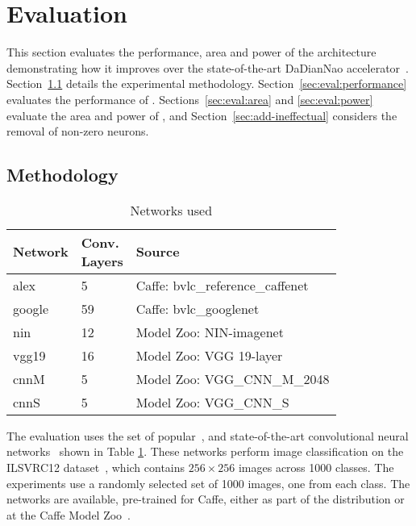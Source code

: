 \section{Evaluation}
\label{sec:eval}

This section evaluates the performance, area and power of the \ZF architecture demonstrating how it improves over the state-of-the-art  DaDianNao accelerator~\cite{DaDiannao}. 
Section~\ref{sec:eval:method} details the experimental methodology. 
Section~\ref{sec:eval:performance} evaluates the performance of \ZF. 
Sections~\ref{sec:eval:area} and \ref{sec:eval:power} evaluate the area and power of \ZF, and Section~\ref{sec:add-ineffectual} considers the removal of non-zero neurons.

%
%

%

\subsection{Methodology}
\label{sec:eval:method}


%
%
\begin{table}[t!]
\centering
\begin{tabular}{|l|l|l|}
\hline
\textbf{Network} & \pbox{5cm}{\textbf{Conv.} \\ \textbf{Layers}} & \textbf{Source} \\ \hline \hline
alex     	 & 5 & Caffe: bvlc\_reference\_caffenet \\ \hline
google 	 & 59 & Caffe: bvlc\_googlenet \\ \hline
nin 		 & 12 & Model Zoo: NIN-imagenet \\ \hline
vgg19  	 & 16 & Model Zoo: VGG 19-layer \\ \hline
cnnM  & 5 & Model Zoo: VGG\_CNN\_M\_2048 \\ \hline
cnnS  & 5 & Model Zoo: VGG\_CNN\_S \\ \hline
\end{tabular}
\caption{Networks used}
\label{table:networks}
\end{table}

The evaluation uses the set of popular~\cite{AlexNIPS2012}, and state-of-the-art convolutional neural networks~\cite{ILSVRC15}\cite{nin}\cite{vgg}\cite{vgg19} shown in Table \ref{table:networks}. 
These networks perform image classification on the ILSVRC12 dataset~\cite{ILSVRC15}, which contains $256\times256$ images across 1000 classes. 
The experiments use a randomly selected set of 1000 images, one from each class. The networks are available, pre-trained for Caffe, either as part of the distribution or at the Caffe Model Zoo~\cite{model-zoo}.

